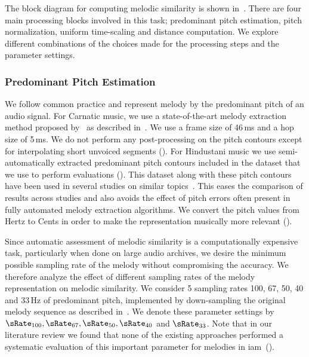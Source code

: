 The block diagram for computing melodic similarity is shown in~. There are four main processing blocks involved in this task; predominant pitch estimation, pitch normalization, uniform time-scaling and distance computation. We explore different combinations of the choices made for the processing steps and the parameter settings.

\subsubsection{Predominant Pitch Estimation}
\label{sec:patterns_melodic_similarity_representation}

We follow common practice and represent melody by the predominant pitch of an audio signal. For Carnatic music, we use a state-of-the-art melody extraction method proposed by~\cite{Salamon2012} as described in~. We use a frame size of 46\,ms and a hop size of 5\,ms. We do not perform any post-processing on the pitch contours except for interpolating short unvoiced segments (). For Hindustani music we use semi-automatically extracted predominant pitch contours included in the dataset that we use to perform evaluations (). This dataset along with these pitch contours have been used in several studies on similar topics~\citep{Rao2014,Ross2012b,Ross2012}. This eases the comparison of results across studies and also avoids the effect of pitch errors often present in fully automated melody extraction algorithms. We convert the pitch values from Hertz to Cents in order to make the representation musically more relevant ().

Since automatic assessment of melodic similarity is a computationally expensive task, particularly when done on large audio archives, we desire the minimum possible sampling rate of the melody without compromising the accuracy. We therefore analyze the effect of different sampling rates of the melody representation on melodic similarity. We consider 5 sampling rates 100, 67, 50, 40 and 33\,Hz of predominant pitch, implemented by down-sampling the original melody sequence as described in~. We denote these parameter settings by $\sRate_{100}, \sRate_{67}, \sRate_{50}, \sRate_{40}$ and $\sRate_{33}$. Note that in our literature review we found that none of the existing approaches performed a systematic evaluation of this important parameter for melodies in \gls{iam}~().


